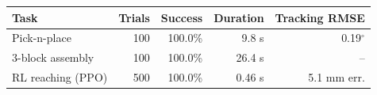 \begin{tabular}{lrrrr}
\toprule
Task & Trials & Success & Duration & Tracking RMSE \\
\midrule
Pick-n-place & 100 & 100.0\% & 9.8 s & 0.19$^\circ$ \\
3-block assembly & 100 & 100.0\% & 26.4 s & -- \\
RL reaching (PPO) & 500 & 100.0\% & 0.46 s & 5.1 mm err. \\
\bottomrule
\end{tabular}
